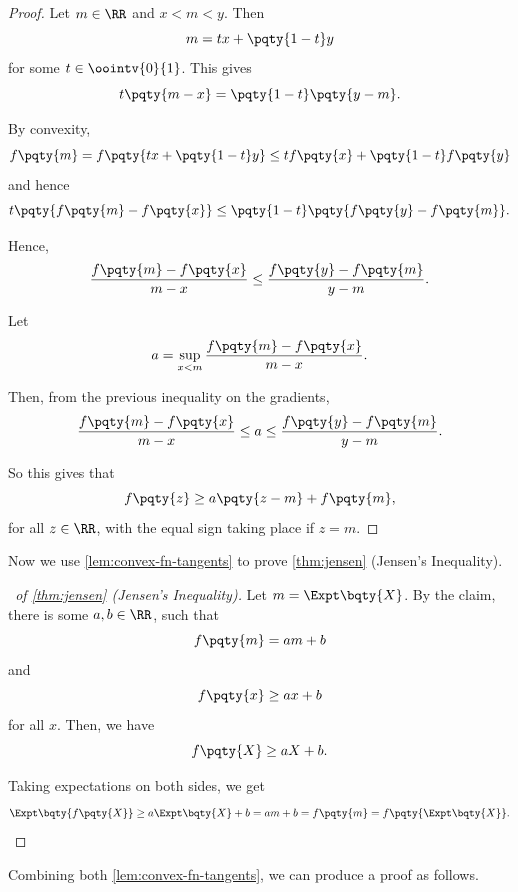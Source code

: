 \begin{proof}
    Let \(m \in \RR\) and \(x < m < y\). Then
    \[
        m = tx + \pqty{1 - t}y
    \]
    for some \(t \in \oointv{0}{1}\). This gives
    \[
        t\pqty{m - x} = \pqty{1 - t} \pqty{y - m}.
    \]

    By convexity,
    \[
        f\pqty{m} = f\pqty{tx + \pqty{1 - t} y} \leq t f\pqty{x} + \pqty{1 - t} f\pqty{y}
    \]
    and hence
    \[
        t\pqty{f\pqty{m} - f\pqty{x}} \leq \pqty{1 - t} \pqty{f\pqty{y} - f\pqty{m}}.
    \]

    Hence,
    \[
        \frac{f\pqty{m} - f\pqty{x}}{m - x} \leq \frac{f\pqty{y} - f\pqty{m}}{y - m}.
    \]

    Let
    \[
        a = \sup_{x < m} \frac{f\pqty{m} - f\pqty{x}}{m - x}.
    \]

    Then, from the previous inequality on the gradients,
    \[
        \frac{f\pqty{m} - f\pqty{x}}{m - x} \leq a \leq \frac{f\pqty{y} - f\pqty{m}}{y - m}.
    \]

    So this gives that
    \[
        f\pqty{z} \geq a\pqty{z - m} + f\pqty{m},
    \]
    for all \(z \in \RR\), with the equal sign taking place if \(z = m\).
\end{proof}

Now we use \autoref{lem:convex-fn-tangents} to prove \autoref{thm:jensen} (Jensen's Inequality).

\begin{proof}[\proofname\ of \autoref{thm:jensen} (Jensen's Inequality)]
    Let \(m = \Expt\bqty{X}\). By the claim, there is some \(a, b \in \RR\), such that
    \[
        f\pqty{m} = am + b
    \]
    and
    \[
        f\pqty{x} \geq ax + b
    \]
    for all \(x\). Then, we have
    \[
        f\pqty{X} \geq aX + b.
    \]

    Taking expectations on both sides, we get
    \[
        \Expt\bqty{f\pqty{X}} \geq a \Expt\bqty{X} + b = am + b = f\pqty{m} = f\pqty{\Expt\bqty{X}}.
    \]
\end{proof}

Combining both \autoref{lem:convex-fn-tangents}, we can produce a proof as follows.

